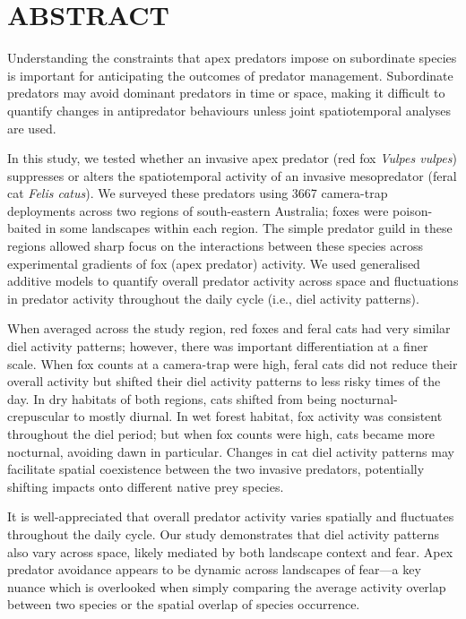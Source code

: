 \documentclass[]{elsarticle} %
\begin{document}
\hypertarget{abstract}{%
\section*{ABSTRACT}\label{abstract}}

Understanding the constraints that apex predators impose on subordinate species is important for anticipating the outcomes of predator management. Subordinate predators may avoid dominant predators in time or space, making it difficult to quantify changes in antipredator behaviours unless joint spatiotemporal analyses are used.

In this study, we tested whether an invasive apex predator (red fox \emph{Vulpes vulpes}) suppresses or alters the spatiotemporal activity of an invasive mesopredator (feral cat \emph{Felis catus}). We surveyed these predators using 3667 camera-trap deployments across two regions of south-eastern Australia; foxes were poison-baited in some landscapes within each region. The simple predator guild in these regions allowed sharp focus on the interactions between these species across experimental gradients of fox (apex predator) activity. We used generalised additive models to quantify overall predator activity across space and fluctuations in predator activity throughout the daily cycle (i.e., diel activity patterns).

When averaged across the study region, red foxes and feral cats had very similar diel activity patterns; however, there was important differentiation at a finer scale. When fox counts at a camera-trap were high, feral cats did not reduce their overall activity but shifted their diel activity patterns to less risky times of the day. In dry habitats of both regions, cats shifted from being nocturnal-crepuscular to mostly diurnal. In wet forest habitat, fox activity was consistent throughout the diel period; but when fox counts were high, cats became more nocturnal, avoiding dawn in particular. Changes in cat diel activity patterns may facilitate spatial coexistence between the two invasive predators, potentially shifting impacts onto different native prey species.

It is well-appreciated that overall predator activity varies spatially and fluctuates throughout the daily cycle. Our study demonstrates that diel activity patterns also vary across space, likely mediated by both landscape context and fear. Apex predator avoidance appears to be dynamic across landscapes of fear---a key nuance which is overlooked when simply comparing the average activity overlap between two species or the spatial overlap of species occurrence.
\end{document}

